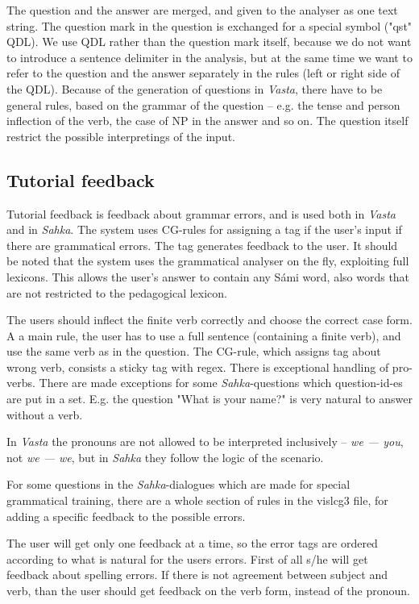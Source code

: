 \documentclass[11pt]{article}
\begin{document}
The question and the answer are merged, and given to the analyser as one text string. The question mark in the question is exchanged for a special symbol ("qst" QDL). We use QDL rather than the question mark itself, because we do not want to introduce a sentence delimiter in the analysis, but at the same time we want to refer to the question and the answer separately in the rules (left or right side of the QDL). Because of the generation of questions in \textit{Vasta}, there have to be general rules, based on the grammar of the question -- e.g. the tense and person inflection of the verb, the case of NP in the answer and so on. The question itself restrict the possible interpretings of the input.

\subsection{Tutorial feedback}
Tutorial feedback is feedback about grammar errors, and is used both in \textit{Vasta} and in \textit{Sahka}. The system uses CG-rules for assigning a tag if the user's input if there are grammatical errors. The tag generates feedback to the user. It should be noted that the system uses the grammatical analyser on the fly, exploiting full lexicons. This allows the user's answer to contain any Sámi word, also words that are not restricted to the pedagogical lexicon.

The users should inflect the finite verb correctly and choose the correct case form. A a main rule, the user has to use a full sentence (containing a finite verb), and use the same verb as in the question. The CG-rule, which assigns tag about wrong verb, consists a sticky tag with regex. There is exceptional handling of pro-verbs. There are made exceptions for some \textit{Sahka}-questions which question-id-es are put in a set. E.g. the question "What is your name?" is very natural to answer without a verb. 

In \textit{Vasta} the pronouns are not allowed to be interpreted inclusively -- \textit{we — you}, not \textit{we — we}, but in \textit{Sahka} they follow the logic of the scenario.

For some questions in the \textit{Sahka}-dialogues which are made for special grammatical training, there are a whole section of rules in the vislcg3 file, for adding a specific feedback to the possible errors.

The user will get only one feedback at a time, so the error tags are ordered according to what is natural for the users errors. First of all s/he will get feedback about spelling errors. If there is not agreement between subject and verb, than the user should get feedback on the verb form, instead of the pronoun.
\end{document}
